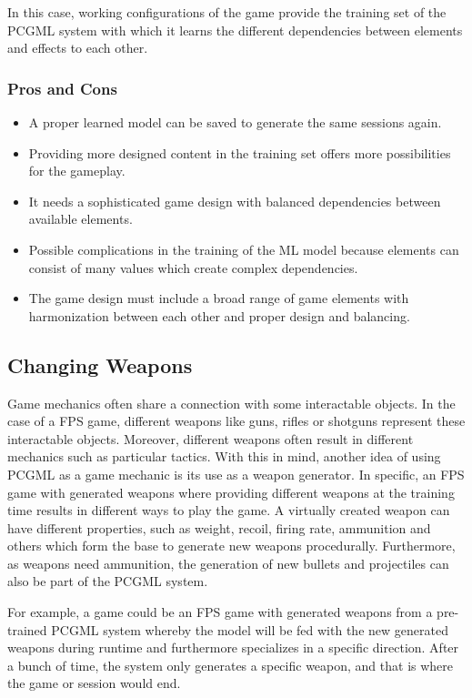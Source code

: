 \documentclass[MGS,Master,english]{twbook}%
\begin{document}
In this case, working configurations of the game provide the training set of the \ac{PCGML} system with which it learns the different dependencies between elements and effects to each other. 

\subsubsection{Pros and Cons}
\begin{itemize}
	\item A proper learned model can be saved to generate the same sessions again.
	\item Providing more designed content in the training set offers more possibilities for the gameplay.
	\item It needs a sophisticated game design with balanced dependencies between available elements.
	\item Possible complications in the training of the \ac{ML} model because elements can consist of many values which create complex dependencies.
	\item The game design must include a broad range of game elements with harmonization between each other and proper design and balancing.
\end{itemize}

\subsection{Changing Weapons} \label{idea::changingWeapons}
Game mechanics often share a connection with some interactable objects. In the case of a \ac{FPS} game, different weapons like guns, rifles or shotguns represent these interactable objects. Moreover, different weapons often result in different mechanics such as particular tactics. With this in mind, another idea of using \ac{PCGML} as a game mechanic is its use as a weapon generator. In specific, an \ac{FPS} game with generated weapons where providing different weapons at the training time results in different ways to play the game. A virtually created weapon can have different properties, such as weight, recoil, firing rate, ammunition and others which form the base to generate new weapons procedurally. Furthermore, as weapons need ammunition, the generation of new bullets and projectiles can also be part of the \ac{PCGML} system. 

For example, a game could be an \ac{FPS} game with generated weapons from a pre-trained \ac{PCGML} system whereby the model will be fed with the new generated weapons during runtime and furthermore specializes in a specific direction. After a bunch of time, the system only generates a specific weapon, and that is where the game or session would end.
\end{document}
